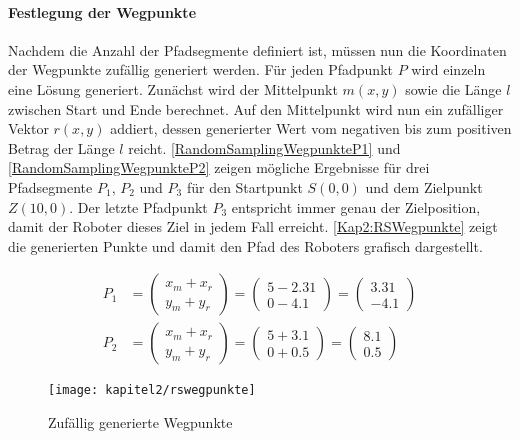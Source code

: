 \paragraph{Festlegung der Wegpunkte}

Nachdem die Anzahl der Pfadsegmente definiert ist, müssen nun die Koordinaten der Wegpunkte zufällig generiert werden. Für jeden Pfadpunkt $P$ wird einzeln eine Lösung generiert. Zunächst wird der Mittelpunkt $m(x, y)$ sowie die Länge $l$ zwischen Start und Ende berechnet. Auf den Mittelpunkt wird nun ein zufälliger Vektor $r(x, y)$ addiert, dessen generierter Wert vom negativen bis zum positiven Betrag der Länge $l$ reicht. \autoref{RandomSamplingWegpunkteP1} und \autoref{RandomSamplingWegpunkteP2} zeigen mögliche Ergebnisse für drei Pfadsegmente $P_1$, $P_2$ und $P_3$ für den Startpunkt $S(0,0)$ und dem Zielpunkt $Z(10,0)$. Der letzte Pfadpunkt $P_3$ entspricht immer genau der Zielposition, damit der Roboter dieses Ziel in jedem Fall erreicht. \autoref{Kap2:RSWegpunkte} zeigt die generierten Punkte und damit den Pfad des Roboters grafisch dargestellt.

\begin{align}
\label{RandomSamplingWegpunkteP1} P_1&=\left(\begin{array}{c} x_m + x_r \\ y_m + y_r \end{array}\right)=\left(\begin{array}{c} 5 - 2.31 \\ 0 - 4.1 \end{array}\right)=\left(\begin{array}{c} 3.31 \\ -4.1 \end{array}\right) \\[1em]
\label{RandomSamplingWegpunkteP2} P_2&=\left(\begin{array}{c} x_m + x_r \\ y_m + y_r \end{array}\right)=\left(\begin{array}{c} 5 + 3.1 \\ 0 + 0.5 \end{array}\right)=\left(\begin{array}{c} 8.1 \\ 0.5 \end{array}\right)
\end{align}

\begin{figure}[t!]
  \centering
  \texttt{[image: kapitel2/rswegpunkte]}
  \caption{Zufällig generierte Wegpunkte}
  \label{Kap2:RSWegpunkte}
\end{figure}

